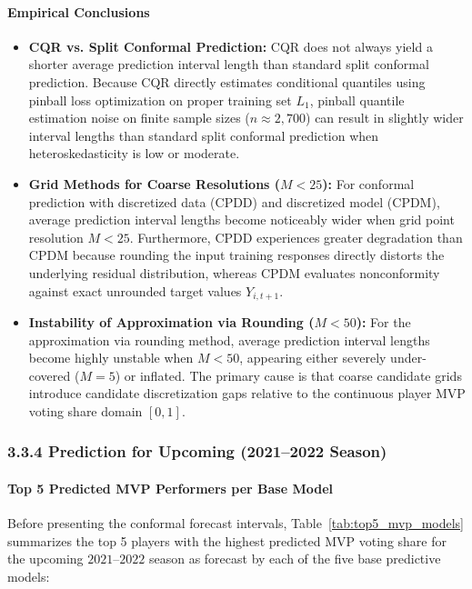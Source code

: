 \documentclass[11pt,a4paper]{article}
\begin{document}
\paragraph{Empirical Conclusions}
\begin{itemize}
    \item \textbf{CQR vs. Split Conformal Prediction:} CQR does not always yield a shorter average prediction interval length than standard split conformal prediction. Because CQR directly estimates conditional quantiles using pinball loss optimization on proper training set $L_1$, pinball quantile estimation noise on finite sample sizes ($n \approx 2,700$) can result in slightly wider interval lengths than standard split conformal prediction when heteroskedasticity is low or moderate.
    \item \textbf{Grid Methods for Coarse Resolutions ($M < 25$):} For conformal prediction with discretized data (CPDD) and discretized model (CPDM), average prediction interval lengths become noticeably wider when grid point resolution $M < 25$. Furthermore, CPDD experiences greater degradation than CPDM because rounding the input training responses directly distorts the underlying residual distribution, whereas CPDM evaluates nonconformity against exact unrounded target values $Y_{i, t+1}$.
    \item \textbf{Instability of Approximation via Rounding ($M < 50$):} For the approximation via rounding method, average prediction interval lengths become highly unstable when $M < 50$, appearing either severely under-covered ($M=5$) or inflated. The primary cause is that coarse candidate grids introduce candidate discretization gaps relative to the continuous player MVP voting share domain $[0, 1]$.
\end{itemize}

\subsubsection{3.3.4 Prediction for Upcoming (2021--2022 Season)}

\paragraph{Top 5 Predicted MVP Performers per Base Model}
Before presenting the conformal forecast intervals, Table~\ref{tab:top5_mvp_models} summarizes the top 5 players with the highest predicted MVP voting share for the upcoming $2021$--$2022$ season as forecast by each of the five base predictive models:
\end{document}

